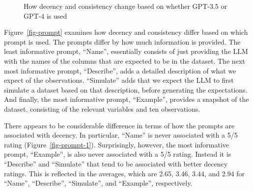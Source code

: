 \documentclass[
  letterpaper,
  DIV=11,
  numbers=noendperiod]{scrartcl}
\begin{document}
\begin{figure}

\begin{minipage}[t]{0.50\linewidth}

{\centering 


}

\end{minipage}%
%
\begin{minipage}[t]{0.50\linewidth}

{\centering 


}

\end{minipage}%

\caption{\label{fig-version}How decency and consistency change based on
whether GPT-3.5 or GPT-4 is used}

\end{figure}

Figure~\ref{fig-prompt} examines how decency and consistency differ
based on which prompt is used. The prompts differ by how much
information is provided. The least informative prompt, ``Name'',
essentially consists of just providing the LLM with the names of the
columns that are expected to be in the dataset. The next most
informative prompt, ``Describe'', adds a detailed description of what we
expect of the observations. ``Simulate'' adds that we expect the LLM to
first simulate a dataset based on that description, before generating
the expectations. And finally, the most informative prompt, ``Example'',
provides a snapshot of the dataset, consisting of the relevant variables
and ten observations.

There appears to be considerable difference in terms of how the prompts
are associated with decency. In particular, ``Name'' is never associated
with a 5/5 rating (Figure~\ref{fig-prompt-1}). Surprisingly, however,
the most informative prompt, ``Example'', is also never associated with
a 5/5 rating. Instead it is ``Describe'' and ``Simulate'' that tend to
be associated with better decency ratings. This is reflected in the
averages, which are 2.65, 3.46, 3.44, and 2.94 for ``Name'',
``Describe'', ``Simulate'', and ``Example'', respectively.
\end{document}
